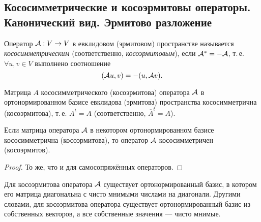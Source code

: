 \subsection{Кососимметрические и косоэрмитовы операторы. Канонический вид. Эрмитово разложение}

\setcounter{definition}{0}
\setcounter{proposal}{0}
\setcounter{lemma}{0}
\setcounter{theorem}{0}

\begin{definition}
    Оператор $\mathcal{A}: V \to V$ в евклидовом (эрмитовом) пространстве называется \textit{кососимметрическим} (соответственно, \textit{косоэрмитовым}), если $\mathcal{A}^\ast = -\mathcal{A}$, т.\,е. $\forall u, v \in V$ выполнено соотношение
    \[
        (\mathcal{A} u, v) = -(u, \mathcal{A} v).
    \]
\end{definition}

\begin{proposal}
    Матрица $A$ кососимметрического (косоэрмитова) оператора $\mathcal{A}$ в ортонормированном базисе евклидова (эрмитова) пространства кососимметрична (косоэрмитова), т.\,е. $A^t = A$ (соответственно, $\overline{A}^t = A$).

    Если матрица оператора $\mathcal{A}$ в некотором ортонормированном базисе кососимметрична (косоэрмитова), то оператор $\mathcal{A}$ кососимметричен (косоэрмитов).
\end{proposal}

\begin{proof}
    То же, что и для самосопряжённых операторов.
\end{proof}

\begin{theorem}
    Для косоэрмитова оператора $\mathcal{A}$ существует ортонормированный базис, в котором его матрица диагональна с чисто мнимыми числами на диагонали. Другими словами, для косоэрмитова оператора существует ортонормированный базис из собственных векторов, а все собственные значения --- чисто мнимые.
\end{theorem}


